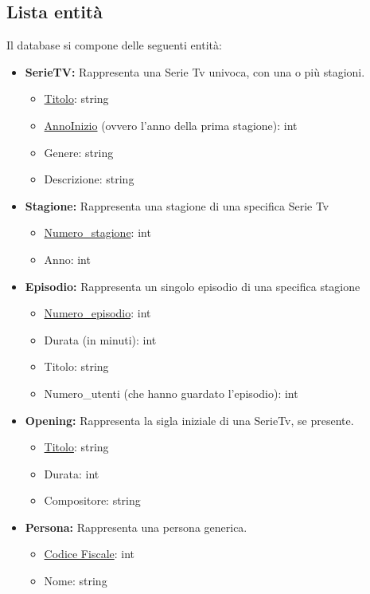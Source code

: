 \documentclass[10pt,a4paper]{article}
\begin{document}
\subsection{Lista entità}
Il database si compone delle seguenti entità:
\begin{itemize}
    \item \textbf{SerieTV:} Rappresenta una Serie Tv univoca, con una o più stagioni.
    \begin{itemize}
        \item \underline{Titolo}: string
        \item \underline{AnnoInizio} (ovvero l'anno della prima stagione): int
        \item Genere: string
        \item Descrizione: string
    \end{itemize}
    \item \textbf{Stagione:} Rappresenta una stagione di una specifica Serie Tv
    \begin{itemize}
        \item \underline{Numero\_stagione}: int
        \item Anno: int
    \end{itemize}
    \item \textbf{Episodio:} Rappresenta un singolo episodio di una specifica stagione
    \begin{itemize}
        \item \underline{Numero\_episodio}: int
        \item Durata (in minuti): int
        \item Titolo: string
        \item Numero\_utenti (che hanno guardato l'episodio): int
    \end{itemize}
    \item \textbf{Opening:} Rappresenta la sigla iniziale di una SerieTv, se presente.
    \begin{itemize}
        \item \underline{Titolo}: string
        \item Durata: int
        \item Compositore: string
    \end{itemize}
    \item \textbf{Persona:} Rappresenta una persona generica.
    \begin{itemize}
        \item \underline{Codice Fiscale}: int
        \item Nome: string

\end{itemize}
\end{itemize}
\end{document}

